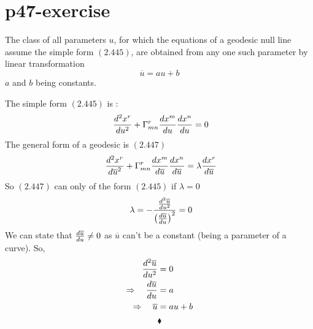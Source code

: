 \section{p47-exercise }
\begin{tcolorbox}
The class of all parameters $u$, for which the equations of a geodesic null line assume the simple form $\mathbf{(2.445)}$, are obtained from any one such parameter by linear transformation $$ \overline{u} = au + b$$ $a$ and $b$ being constants.
\end{tcolorbox}
The simple form $\mathbf{(2.445)}$ is :
\begin{align}
\  \dv[2]{x^r}{u} +\Gamma^r_{mn}\dv{x^m}{u}\dv{x^n}{u} = 0\\
\end{align}
The general form of a geodesic is $\mathbf{(2.447)}$
\begin{align}
\  \dv[2]{x^r}{\overline{u}} +\Gamma^r_{mn}\dv{x^m}{\overline{u}}\dv{x^n}{\overline{u}} = \lambda \dv{x^r}{\overline{u}}\\
\end{align}
So $\mathbf{(2.447)}$ can only of the form $\mathbf{(2.445)}$ if $\lambda = 0$
\begin{align}
\   \lambda  = - \frac{\dv[2]{\overline{u}}{u}}{\left( \dv{\overline{u}}{u}\right)^2} = 0\\
\end{align}
We can state that $\dv{\overline{u}}{u}\ne 0$ as $\overline{u}$ can't be a constant (being a parameter of a curve). So,
\begin{align}
\dv[2]{\overline{u}}{u}&=0\\
\Rightarrow \quad \dv{\overline{u}}{u}&=a\\
\Rightarrow \quad \overline{u}&=au +b
\end{align}
$$\blacklozenge$$
\newpage

